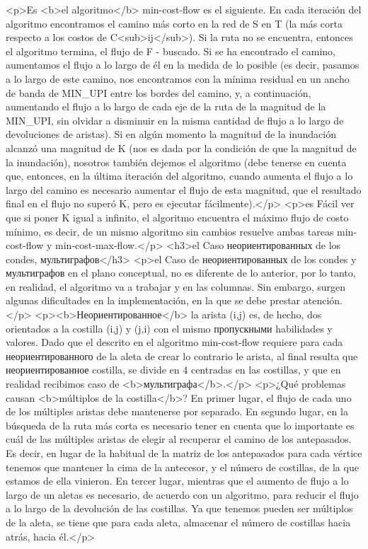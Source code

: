 <p>Es <b>el algoritmo</b> min-cost-flow es el siguiente. En cada iteración del algoritmo encontramos el camino más corto en la red de S en T (la más corta respecto a los costos de C<sub>ij</sub>). Si la ruta no se encuentra, entonces el algoritmo termina, el flujo de F - buscado. Si se ha encontrado el camino, aumentamos el flujo a lo largo de él en la medida de lo posible (es decir, pasamos a lo largo de este camino, nos encontramos con la mínima residual en un ancho de banda de MIN_UPI entre los bordes del camino, y, a continuación, aumentando el flujo a lo largo de cada eje de la ruta de la magnitud de la MIN_UPI, sin olvidar a disminuir en la misma cantidad de flujo a lo largo de devoluciones de aristas). Si en algún momento la magnitud de la inundación alcanzó una magnitud de K (nos es dada por la condición de que la magnitud de la inundación), nosotros también dejemos el algoritmo (debe tenerse en cuenta que, entonces, en la última iteración del algoritmo, cuando aumenta el flujo a lo largo del camino es necesario aumentar el flujo de esta magnitud, que el resultado final en el flujo no superó K, pero es ejecutar fácilmente).</p>
<p>es Fácil ver que si poner K igual a infinito, el algoritmo encuentra el máximo flujo de costo mínimo, es decir, de un mismo algoritmo sin cambios resuelve ambas tareas min-cost-flow y min-cost-max-flow.</p>
<h3>el Caso неориентированных de los condes, мультиграфов</h3>
<p>el Caso de неориентированных de los condes y мультиграфов en el plano conceptual, no es diferente de lo anterior, por lo tanto, en realidad, el algoritmo va a trabajar y en las columnas. Sin embargo, surgen algunas dificultades en la implementación, en la que se debe prestar atención.</p>
<p><b>Неориентированное</b> la arista (i,j) es, de hecho, dos orientados a la costilla (i,j) y (j,i) con el mismo пропускными habilidades y valores. Dado que el descrito en el algoritmo min-cost-flow requiere para cada неориентированного de la aleta de crear lo contrario le arista, al final resulta que неориентированное costilla, se divide en 4 centradas en las costillas, y que en realidad recibimos caso de <b>мультиграфа</b>.</p>
<p>¿Qué problemas causan <b>múltiplos de la costilla</b>? En primer lugar, el flujo de cada uno de los múltiples aristas debe mantenerse por separado. En segundo lugar, en la búsqueda de la ruta más corta es necesario tener en cuenta que lo importante es cuál de las múltiples aristas de elegir al recuperar el camino de los antepasados. Es decir, en lugar de la habitual de la matriz de los antepasados para cada vértice tenemos que mantener la cima de la antecesor, y el número de costillas, de la que estamos de ella vinieron. En tercer lugar, mientras que el aumento de flujo a lo largo de un aletas es necesario, de acuerdo con un algoritmo, para reducir el flujo a lo largo de la devolución de las costillas. Ya que tenemos pueden ser múltiplos de la aleta, se tiene que para cada aleta, almacenar el número de costillas hacia atrás, hacia él.</p>
